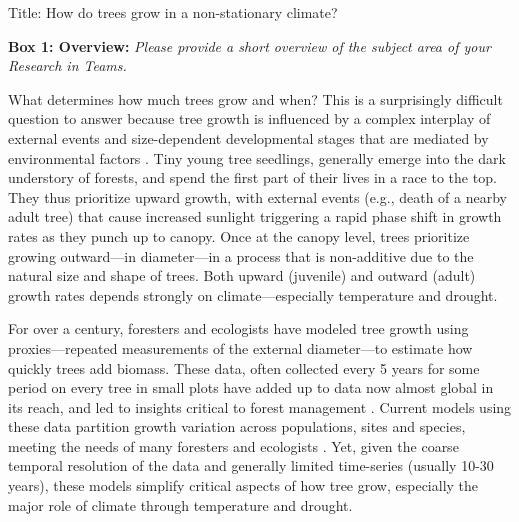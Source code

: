\documentclass[11pt]{article}
\begin{document}
\renewcommand{\refname}{\CHead{}}




{\Large Title: How do trees grow in a non-stationary climate?} 
\vspace{3ex}

{\bf Box 1: Overview:} \emph{Please provide a short overview of the subject area of your Research in Teams.}

What determines how much trees grow and when? This is a surprisingly difficult question to answer because tree growth is influenced by a complex interplay of  external events and size-dependent developmental stages that are mediated by environmental factors \citep{Chapin:2002nh,larcher2003}. Tiny young tree seedlings, generally emerge into the dark understory of forests, and spend the first part of their lives in a race to the top. They thus prioritize upward growth, with external events (e.g., death of a nearby adult tree) that cause increased sunlight triggering a rapid phase shift in growth rates as they punch up to canopy. Once at the canopy level, trees prioritize growing outward---in diameter---in a process that is non-additive due to the natural size and shape of trees. Both upward (juvenile) and outward (adult) growth rates depends strongly on climate—especially temperature and drought. 

For over a century, foresters and ecologists have modeled tree growth using proxies---repeated measurements of the external diameter---to estimate how quickly trees add biomass. These data, often collected every 5 years for some period on every tree in small plots have added up to data now almost global in its reach, and led to insights critical to forest management \citep{condit1993identifying,stoll1994growth}. Current models using these data partition growth variation across populations, sites and species, meeting the needs of many foresters and ecologists \citep[e.g.,][]{zhang2017effect}. Yet, given the coarse temporal resolution of the data and generally limited time-series (usually 10-30 years), these models simplify critical aspects of how tree grow, especially the major role of climate through temperature and drought. 
\end{document}
